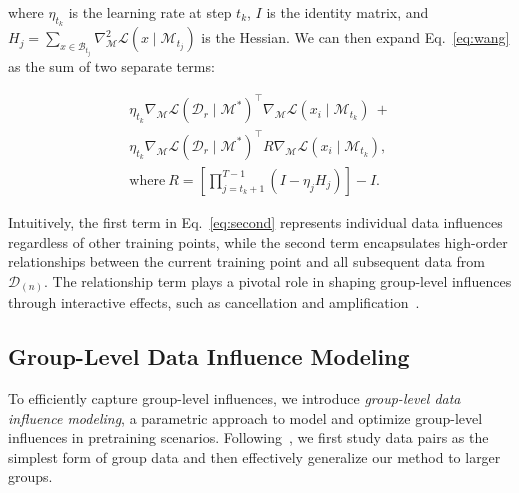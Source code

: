 where $\eta_{t_k}$ is the learning rate at step $t_k$, $I$ is the identity matrix, and $H_j = \sum_{x\in\mathcal{B}_{t_j}}\nabla^2_{\mathcal{M}} \mathcal{L}(x \mid \mathcal{M}_{t_j})$ is the Hessian. We can then expand Eq.~\ref{eq:wang} as the sum of two separate terms:
\begin{small}
\begin{align}
    \eta_{t_k} \nabla_{\mathcal{M}} \mathcal{L}(\mathcal{D}_r \mid \mathcal{M}^*)^\top \nabla_{\mathcal{M}} \mathcal{L}(x_i \mid \mathcal{M}_{t_k})~+ \nonumber\\
    \eta_{t_k} \nabla_{\mathcal{M}} \mathcal{L}(\mathcal{D}_r \mid \mathcal{M}^*)^\top R \nabla_{\mathcal{M}} \mathcal{L}(x_i \mid \mathcal{M}_{t_k}), \label{eq:second}\\
    \text{where}~R=\left[ \prod_{j=t_k+1}^{T-1} \left(I - \eta_j H_j \right) \right]-I.
\end{align}
\end{small}

Intuitively, the first term in Eq.~\ref{eq:second} represents individual data influences regardless of other training points, while the second term encapsulates high-order relationships between the current training point and all subsequent data from $\mathcal{D}_{(n)}$. The relationship term plays a pivotal role in shaping group-level influences through interactive effects, such as cancellation and amplification~\cite{hu2024most}.


\subsection{Group-Level Data Influence Modeling}
\label{sec:modeling}

To efficiently capture group-level influences, we introduce \textit{group-level data influence modeling}, a parametric approach to model and optimize group-level influences in pretraining scenarios.
Following~\citet{hu2024most}, we first study data pairs as the simplest form of group data and then effectively generalize our method to larger groups.

